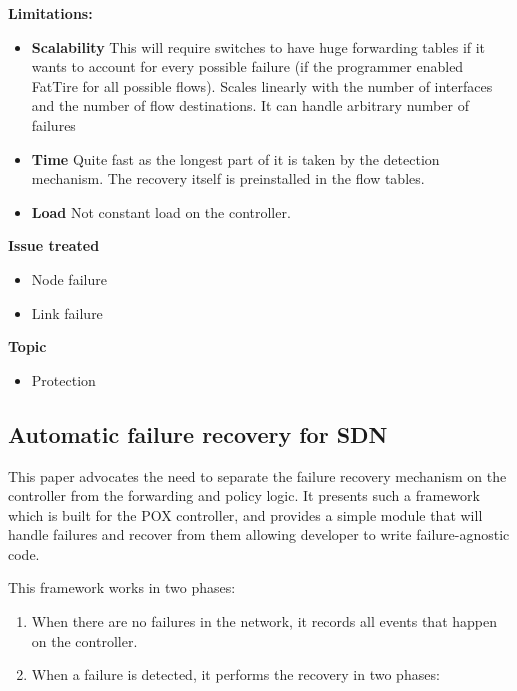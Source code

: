 \documentclass[compsoc]{IEEEtran}
\begin{document}
\textbf{Limitations:}
\begin{itemize}
	\item \textbf{Scalability} This will require switches to have huge forwarding tables if it wants to account for every possible failure (if the programmer enabled FatTire for all possible flows). Scales linearly with the number of interfaces and the number of flow destinations. It can handle arbitrary number of failures
	\item \textbf{Time} Quite fast as the longest part of it is taken by the detection mechanism. The recovery itself is preinstalled in the flow tables.
	\item \textbf{Load} Not constant load on the controller.
\end{itemize}

\textbf{Issue treated}
\begin{itemize}
	\item Node failure
	\item Link failure
\end{itemize}

\textbf{Topic}
\begin{itemize}
	\item Protection
\end{itemize}

\subsection{Automatic failure recovery for SDN \cite{Kuzniar:2013:AFR:2491185.2491218}}
This paper advocates the need to separate the failure recovery mechanism on the controller from the forwarding and policy logic. It presents such a framework which is built for the POX controller, and provides a simple module that will handle failures and recover from them allowing developer to write failure-agnostic code.

This framework works in two phases:
\begin{enumerate}
	\item When there are no failures in the network, it records all events that happen on the controller.
	\item When a failure is detected, it performs the recovery in two phases:
\end{enumerate}
\end{document}
